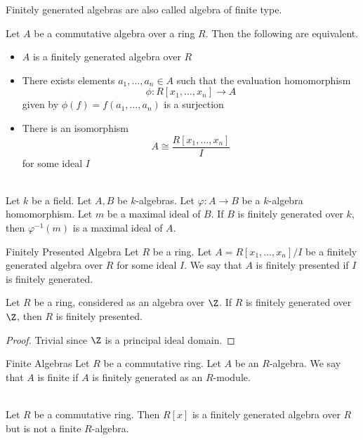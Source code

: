 \documentclass[a4paper]{article}
\begin{document}
Finitely generated algebras are also called algebra of finite type. 

\begin{prp}{}{} Let $A$ be a commutative algebra over a ring $R$. Then the following are equivalent. 
\begin{itemize}
\item $A$ is a finitely generated algebra over $R$
\item There exists elements $a_1,\dots,a_n\in A$ such that the evaluation homomorphism $$\phi:R[x_1,\dots,x_n]\to A$$ given by $\phi(f)=f(a_1,\dots,a_n)$ is a surjection
\item There is an isomorphism $$A\cong\frac{R[x_1,\dots,x_n]}{I}$$ for some ideal $I$
\end{itemize}
\end{prp}

\begin{prp}{}{}\\
Let $k$ be a field. Let $A,B$ be $k$-algebras. Let $\varphi:A\to B$ be a $k$-algebra homomorphism. Let $m$ be a maximal ideal of $B$. If $B$ is finitely generated over $k$, then $\varphi^{-1}(m)$ is a maximal ideal of $A$. 
\end{prp}

\begin{defn}{Finitely Presented Algebra}{} Let $R$ be a ring. Let $A=R[x_1,\dots,x_n]/I$ be a finitely generated algebra over $R$ for some ideal $I$. We say that $A$ is finitely presented if $I$ is finitely generated. 
\end{defn}

\begin{lmm}{}{} Let $R$ be a ring, considered as an algebra over $\Z$. If $R$ is finitely generated over $\Z$, then $R$ is finitely presented. 
\begin{proof}
Trivial since $\Z$ is a principal ideal domain. 
\end{proof}
\end{lmm}

\begin{defn}{Finite Algebras}{} Let $R$ be a commutative ring. Let $A$ be an $R$-algebra. We say that $A$ is finite if $A$ is finitely generated as an $R$-module. 
\end{defn}

\begin{eg}{}{}\\
Let $R$ be a commutative ring. Then $R[x]$ is a finitely generated algebra over $R$ but is not a finite $R$-algebra. 
\end{eg}
\end{document}
